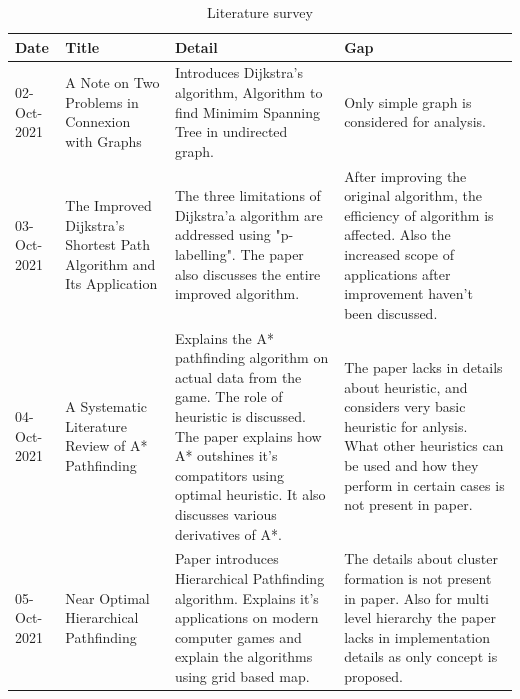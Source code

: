 \documentclass[a4paper, 12pt]{article}
\newcommand\Tstrut{\rule{0pt}{2.6ex}}       %
\newcommand\Bstrut{\rule[-0.9ex]{0pt}{0pt}} %
\newcommand{\TBstrut}{\Tstrut\Bstrut} %
\begin{document}
\begin{center}
\begin{flushleft}

\begin{table}[h!]
 \caption{Literature survey}
 \begin{tabular}{|p{2cm}|p{3.5cm}|p{3.5cm}|p{3.5cm}|}
\hline
Date & Title  & Detail   & Gap  \\
\hline 
02-Oct-2021
& A Note on Two Problems in Connexion with Graphs
& Introduces Dijkstra's algorithm, Algorithm to find Minimim Spanning Tree in undirected graph.
& Only simple graph is considered for analysis. \TBstrut\\
\hline 
03-Oct-2021
& The Improved Dijkstra's Shortest Path Algorithm and Its Application
& The three limitations of Dijkstra'a algorithm are addressed using "p-labelling". The paper also discusses the entire improved algorithm.
& After improving the original algorithm, the efficiency of algorithm is affected. Also the increased scope of applications after improvement haven't been discussed. \TBstrut\\
\hline 
04-Oct-2021
& A Systematic Literature Review of A* Pathfinding
& Explains the A* pathfinding algorithm on actual data from the game. The role of heuristic is discussed. The paper explains how A* outshines it's compatitors using optimal heuristic. It also discusses various derivatives of A*.
& The paper lacks in details about heuristic, and considers very basic heuristic for anlysis. What other heuristics can be used and how they perform in certain cases is not present in paper.\TBstrut \\
\hline 
05-Oct-2021
& Near Optimal Hierarchical Pathfinding
& Paper introduces Hierarchical Pathfinding algorithm. Explains it's applications on modern computer games and explain the algorithms using grid based map.
& The details about cluster formation is not present in paper. Also for multi level hierarchy the paper lacks in implementation details as only concept is proposed.\TBstrut \\
 \hline


\end{tabular}
\end{table}
\end{flushleft}
\end{center}
\end{document}

